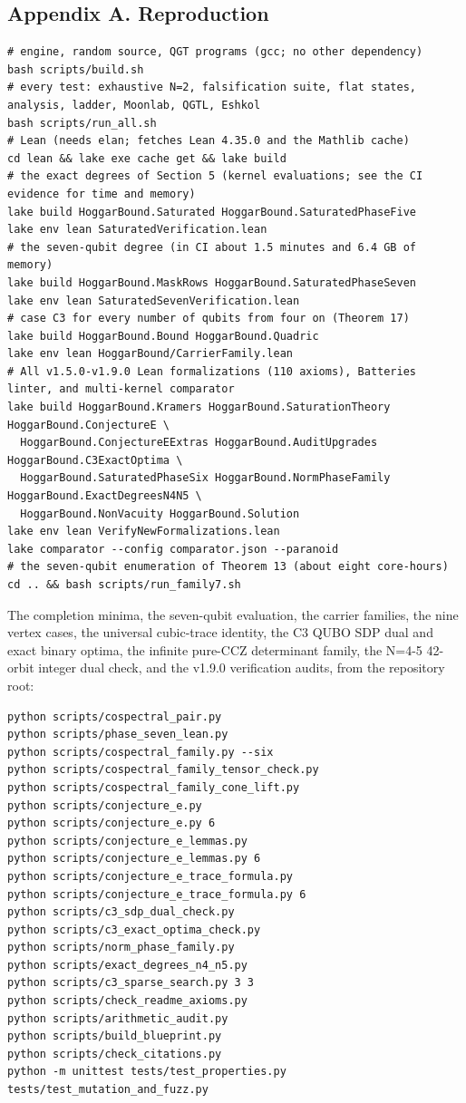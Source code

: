 \documentclass[11pt,a4paper]{article}
\begin{document}
\subsection{Appendix A. Reproduction}\label{appendix-a-reproduction}

\begin{verbatim}
# engine, random source, QGT programs (gcc; no other dependency)
bash scripts/build.sh
# every test: exhaustive N=2, falsification suite, flat states, analysis, ladder, Moonlab, QGTL, Eshkol
bash scripts/run_all.sh
# Lean (needs elan; fetches Lean 4.35.0 and the Mathlib cache)
cd lean && lake exe cache get && lake build
# the exact degrees of Section 5 (kernel evaluations; see the CI evidence for time and memory)
lake build HoggarBound.Saturated HoggarBound.SaturatedPhaseFive
lake env lean SaturatedVerification.lean
# the seven-qubit degree (in CI about 1.5 minutes and 6.4 GB of memory)
lake build HoggarBound.MaskRows HoggarBound.SaturatedPhaseSeven
lake env lean SaturatedSevenVerification.lean
# case C3 for every number of qubits from four on (Theorem 17)
lake build HoggarBound.Bound HoggarBound.Quadric
lake env lean HoggarBound/CarrierFamily.lean
# All v1.5.0-v1.9.0 Lean formalizations (110 axioms), Batteries linter, and multi-kernel comparator
lake build HoggarBound.Kramers HoggarBound.SaturationTheory HoggarBound.ConjectureE \
  HoggarBound.ConjectureEExtras HoggarBound.AuditUpgrades HoggarBound.C3ExactOptima \
  HoggarBound.SaturatedPhaseSix HoggarBound.NormPhaseFamily HoggarBound.ExactDegreesN4N5 \
  HoggarBound.NonVacuity HoggarBound.Solution
lake env lean VerifyNewFormalizations.lean
lake comparator --config comparator.json --paranoid
# the seven-qubit enumeration of Theorem 13 (about eight core-hours)
cd .. && bash scripts/run_family7.sh
\end{verbatim}

The completion minima, the seven-qubit evaluation, the carrier families, the nine vertex cases, the
universal cubic-trace identity, the C3 QUBO SDP dual and exact binary optima, the infinite pure-CCZ
determinant family, the N=4-5 42-orbit integer dual check, and the v1.9.0 verification audits, from
the repository root:

\begin{verbatim}
python scripts/cospectral_pair.py
python scripts/phase_seven_lean.py
python scripts/cospectral_family.py --six
python scripts/cospectral_family_tensor_check.py
python scripts/cospectral_family_cone_lift.py
python scripts/conjecture_e.py
python scripts/conjecture_e.py 6
python scripts/conjecture_e_lemmas.py
python scripts/conjecture_e_lemmas.py 6
python scripts/conjecture_e_trace_formula.py
python scripts/conjecture_e_trace_formula.py 6
python scripts/c3_sdp_dual_check.py
python scripts/c3_exact_optima_check.py
python scripts/norm_phase_family.py
python scripts/exact_degrees_n4_n5.py
python scripts/c3_sparse_search.py 3 3
python scripts/check_readme_axioms.py
python scripts/arithmetic_audit.py
python scripts/build_blueprint.py
python scripts/check_citations.py
python -m unittest tests/test_properties.py tests/test_mutation_and_fuzz.py
\end{verbatim}
\end{document}
